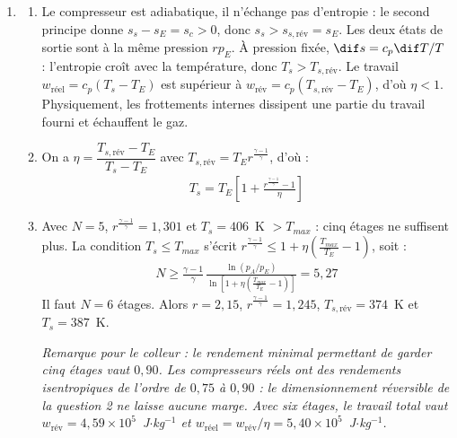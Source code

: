 \begin{correction}
\begin{enumerate}
	\item
	\begin{enumerate}
		\item Le compresseur est adiabatique, il n'échange pas d'entropie : le second principe donne $s_s-s_E=s_c>0$, donc $s_s>s_{s,\text{rév}}=s_E$. Les deux états de sortie sont à la même pression $rp_E$. À pression fixée, $\dif s=c_p\dif T/T$ : l'entropie croît avec la température, donc $T_s>T_{s,\text{rév}}$. Le travail $w_{\text{réel}}=c_p(T_s-T_E)$ est supérieur à $w_{\text{rév}}=c_p(T_{s,\text{rév}}-T_E)$, d'où $\eta<1$. Physiquement, les frottements internes dissipent une partie du travail fourni et échauffent le gaz.

		\item On a $\eta=\dfrac{T_{s,\text{rév}}-T_E}{T_s-T_E}$ avec $T_{s,\text{rév}}=T_Er^{\frac{\gamma-1}{\gamma}}$, d'où :
		\begin{align*}
			\boxed{T_s=T_E\left[1+\frac{r^{\frac{\gamma-1}{\gamma}}-1}{\eta}\right]}
		\end{align*}

		\item Avec $N=5$, $r^{\frac{\gamma-1}{\gamma}}=1{,}301$ et $T_s=406$~K $>T_{max}$ : cinq étages ne suffisent plus. La condition $T_s\leqslant T_{max}$ s'écrit $r^{\frac{\gamma-1}{\gamma}}\leqslant1+\eta\left(\frac{T_{max}}{T_E}-1\right)$, soit :
		\begin{align*}
			\boxed{N\geqslant\frac{\gamma-1}{\gamma}\,\frac{\ln(p_A/p_E)}{\ln\left[1+\eta\left(\frac{T_{max}}{T_E}-1\right)\right]}}=5{,}27
		\end{align*}
		Il faut $N=6$ étages. Alors $r=2{,}15$, $r^{\frac{\gamma-1}{\gamma}}=1{,}245$, $T_{s,\text{rév}}=374$~K et $T_s=387$~K.

		\textit{Remarque pour le colleur : le rendement minimal permettant de garder cinq étages vaut $0{,}90$. Les compresseurs réels ont des rendements isentropiques de l'ordre de $0{,}75$ à $0{,}90$ : le dimensionnement réversible de la question 2 ne laisse aucune marge. Avec six étages, le travail total vaut $w_{\text{rév}}=4{,}59\times10^{5}$~J$\cdot$kg$^{-1}$ et $w_{\text{réel}}=w_{\text{rév}}/\eta=5{,}40\times10^{5}$~J$\cdot$kg$^{-1}$.}
	\end{enumerate}


\end{enumerate}
\end{correction}
